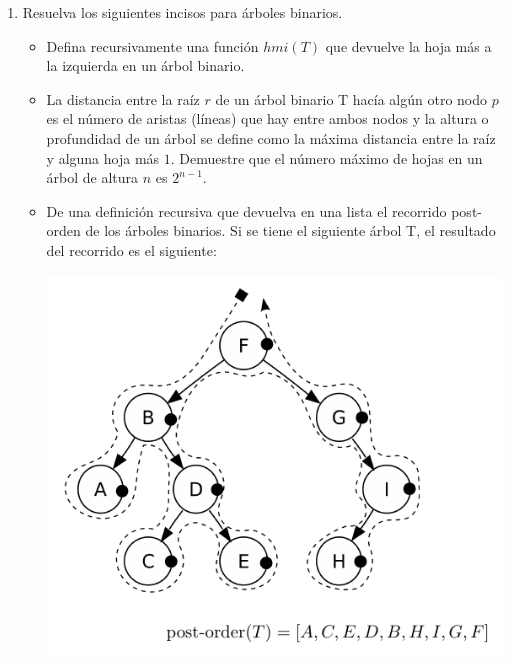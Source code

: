 \documentclass[letterpaper,11pt]{article}
\begin{document}
\begin{enumerate}
    \item Resuelva los siguientes incisos para árboles binarios.
    \begin{itemize}
        \item Defina recursivamente una función $hmi(T)$ que devuelve la hoja
        más a la izquierda en un árbol binario.
        \item La distancia entre la raíz $r$ de un árbol binario T hacía algún
        otro nodo $p$ es el número de aristas (líneas) que hay entre ambos nodos
        y la altura o profundidad de un árbol se define como la máxima distancia
        entre la raíz y alguna hoja más $1$. Demuestre que el número máximo de 
        hojas en un árbol de altura $n$ es $2^{n - 1}$.
        \item De una definición recursiva que devuelva en una lista el recorrido
        post-orden de los árboles binarios. Si se tiene el siguiente árbol T, 
        el resultado del recorrido es el siguiente:
        \begin{center}
            \centerline{\includegraphics[scale=0.7]{recorrido.png}}
        \end{center}    
    \end{itemize}
\end{enumerate}
\end{document}
